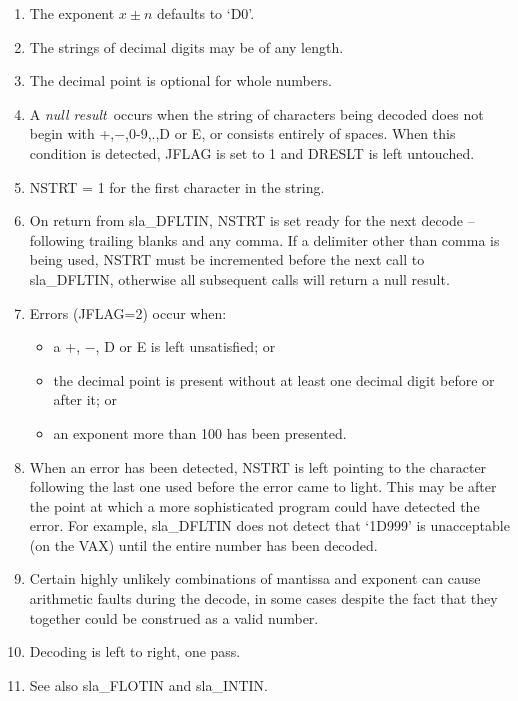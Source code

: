 {\begin{enumerate}
 \item The exponent $x\!\pm\!n$ defaults to `D0'.
 \item The strings of decimal digits may be of any length.
 \item The decimal point is optional for whole numbers.
 \item A {\it null result}\, occurs when the string of characters
       being decoded does not begin with +,$-$,0-9,.,D or E, or
       consists entirely of spaces.  When this condition is
       detected, JFLAG is set to 1 and DRESLT is left untouched.
 \item NSTRT = 1 for the first character in the string.
 \item On return from sla\_DFLTIN, NSTRT is set ready for the next
       decode -- following trailing blanks and any comma.  If a
       delimiter other than comma is being used, NSTRT must be
       incremented before the next call to sla\_DFLTIN, otherwise
       all subsequent calls will return a null result.
 \item Errors (JFLAG=2) occur when:
       \begin{itemize}
       \item a +, $-$, D or E is left unsatisfied; or
       \item the decimal point is present without at least
             one decimal digit before or after it; or
       \item an exponent more than 100 has been presented.
       \end{itemize}
 \item When an error has been detected, NSTRT is left
       pointing to the character following the last
       one used before the error came to light.  This
       may be after the point at which a more sophisticated
       program could have detected the error.  For example,
       sla\_DFLTIN does not detect that `1D999' is unacceptable
       (on the VAX) until the entire number has been decoded.
 \item Certain highly unlikely combinations of mantissa and
       exponent can cause arithmetic faults during the
       decode, in some cases despite the fact that they
       together could be construed as a valid number.
 \item Decoding is left to right, one pass.
 \item See also sla\_FLOTIN and sla\_INTIN.
 \end{enumerate}
}
